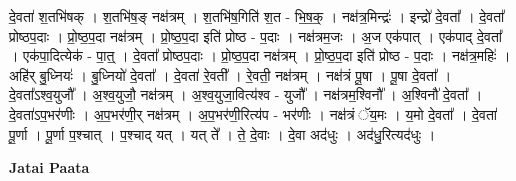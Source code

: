 \documentclass[17pt]{extarticle}
\begin{document}
दे॒वता॑ श॒तभि॑षक् । श॒तभि॑ष॒ङ् नक्ष॑त्रम् । श॒तभि॑ष॒गिति॑ श॒त - भि॒ष॒क्॒ । नक्ष॑त्र॒मिन्द्रः॑ । इन्द्रो॑ दे॒वता᳚ । दे॒वता᳚ प्रोष्ठप॒दाः । प्रो॒ष्ठ॒प॒दा नक्ष॑त्रम् । प्रो॒ष्ठ॒प॒दा इति॑ प्रोष्ठ - प॒दाः । नक्ष॑त्रम॒जः । अ॒ज एक॑पात् । एक॑पाद् दे॒वता᳚ । एक॑पा॒दित्येक॑ - पा॒त्॒ । दे॒वता᳚ प्रोष्ठप॒दाः । प्रो॒ष्ठ॒प॒दा नक्ष॑त्रम् । प्रो॒ष्ठ॒प॒दा इति॑ प्रोष्ठ - प॒दाः । नक्ष॑त्र॒महिः॑ । अहि॑र् बु॒ध्नियः॑ । बु॒ध्नियो॑ दे॒वता᳚ । दे॒वता॑ रे॒वती᳚ । रे॒वती॒ नक्ष॑त्रम् । नक्ष॑त्रं पू॒षा । पू॒षा दे॒वता᳚ । दे॒वता᳚ऽश्व॒युजौ᳚ । अ॒श्व॒युजौ॒ नक्ष॑त्रम् । अ॒श्व॒युजा॒वित्य॑श्व - युजौ᳚ । नक्ष॑त्रम॒श्विनौ᳚ । अ॒श्विनौ॑ दे॒वता᳚ । दे॒वता॑ऽप॒भर॑णीः । अ॒प॒भर॑णी॒र् नक्ष॑त्रम् । अ॒प॒भर॑णी॒रित्य॑प - भर॑णीः । नक्ष॑त्रं ॅय॒मः । य॒मो दे॒वता᳚ । दे॒वता॑ पू॒र्णा । पू॒र्णा प॒श्चात् । प॒श्चाद् यत् । यत् ते᳚ । ते॒ दे॒वाः । दे॒वा अद॑धुः । अद॑धु॒रित्यद॑धुः । \newline

\textbf{Jatai Paata} \newline
\end{document}
